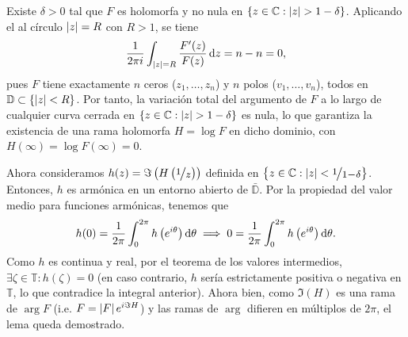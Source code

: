 \begin{dem}
    Existe $\delta > 0$ tal que $F$ es holomorfa y no nula en $\left\{z \in \mathbb{C} : \left|z\right| > 1 - \delta\right\}$. Aplicando el  al círculo $\left|z\right| = R$ con $R > 1$, se tiene
    \[
    \frac{1}{2\pi i} \int_{\abs{z} = R} \frac{F'(z)}{F(z)} \odif{z} = n - n = 0,
    \]
    pues $F$ tiene exactamente $n$ ceros ($z_1, \ldots, z_n$) y $n$ polos ($v_1, \ldots, v_n$), todos en $\mathbb{D} \subset \left\{\left|z\right| < R\right\}$. Por tanto, la variación total del argumento de $F$ a lo largo de cualquier curva cerrada en $\left\{z \in \mathbb{C} : \left|z\right| > 1 - \delta\right\}$ es nula, lo que garantiza la existencia de una rama holomorfa $H = \log F$ en dicho dominio, con $H(\infty) = \log F(\infty) = 0$.

    Ahora consideramos $h(z) = \Im \left(H \left(\sfrac{1}{z}\right)\right)$ definida en $\left\{z \in \mathbb{C} : \abs{z} < \sfrac{1}{1 - \delta}\right\}$. Entonces, $h$ es armónica en un entorno abierto de $\bar{\mathbb{D}}$. Por la propiedad del valor medio para funciones armónicas, tenemos que
    \[
        h(0) = \frac{1}{2\pi} \int_0^{2\pi} h\left(e^{i\theta}\right) \odif{\theta} \implies 0 = \frac{1}{2\pi} \int_0^{2\pi} h \left(e^{i\theta}\right) \odif{\theta}.
    \]
    Como $h$ es continua y real, por el teorema de los valores intermedios, $\exists \zeta \in \mathbb{T} : h(\zeta) = 0$ (en caso contrario, $h$ sería estrictamente positiva o negativa en $\mathbb{T}$, lo que contradice la integral anterior). Ahora bien, como $\Im (H)$ es una rama de $\arg F$ (i.e. $F = \left|F\right| e^{i \Im H}$) y las ramas de $\arg$ difieren en múltiplos de $2\pi$, el lema queda demostrado.\hfill\qedsymbol
\end{dem}

